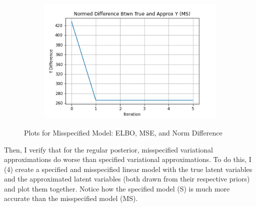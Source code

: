\documentclass[letterpaper,12pt]{article}
\begin{document}
\begin{figure}[h]
\begin{subfigure}{0.32\textwidth}
        \includegraphics[width=\linewidth]{plots/Normed_Difference_Btwn_True_and_Approx_Y_(MS).png}
    \end{subfigure}
    \caption{Plots for Misspecified Model: ELBO, MSE, and Norm Difference}
\end{figure}

Then, I verify that for the regular posterior, misspecified variational approximations do worse than specified variational approximations. To do this, I (4) create a specified and misspecified linear model with the true latent variables and the approximated latent variables (both drawn from their respective priors) and plot them together. Notice how the specified model (S) is much more accurate than the misspecified model (MS).
\end{document}
